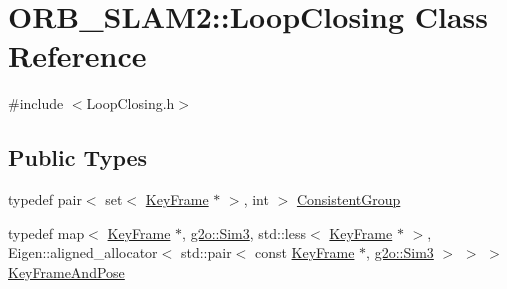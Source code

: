 \hypertarget{class_o_r_b___s_l_a_m2_1_1_loop_closing}{}\section{O\+R\+B\+\_\+\+S\+L\+A\+M2\+:\+:Loop\+Closing Class Reference}
\label{class_o_r_b___s_l_a_m2_1_1_loop_closing}


{\ttfamily \#include $<$Loop\+Closing.\+h$>$}

\subsection*{Public Types}
\begin{DoxyCompactItemize}
\item 
typedef pair$<$ set$<$ \mbox{\hyperlink{class_o_r_b___s_l_a_m2_1_1_key_frame}{Key\+Frame}} $\ast$ $>$, int $>$ \mbox{\hyperlink{class_o_r_b___s_l_a_m2_1_1_loop_closing_a8efed418be885643d3c43113ff1d7bb2}{Consistent\+Group}}
\item 
typedef map$<$ \mbox{\hyperlink{class_o_r_b___s_l_a_m2_1_1_key_frame}{Key\+Frame}} $\ast$, \mbox{\hyperlink{structg2o_1_1_sim3}{g2o\+::\+Sim3}}, std\+::less$<$ \mbox{\hyperlink{class_o_r_b___s_l_a_m2_1_1_key_frame}{Key\+Frame}} $\ast$ $>$, Eigen\+::aligned\+\_\+allocator$<$ std\+::pair$<$ const \mbox{\hyperlink{class_o_r_b___s_l_a_m2_1_1_key_frame}{Key\+Frame}} $\ast$, \mbox{\hyperlink{structg2o_1_1_sim3}{g2o\+::\+Sim3}} $>$ $>$ $>$ \mbox{\hyperlink{class_o_r_b___s_l_a_m2_1_1_loop_closing_ae9ada143a8308ce32990a7c7b5d533ab}{Key\+Frame\+And\+Pose}}
\end{DoxyCompactItemize}
